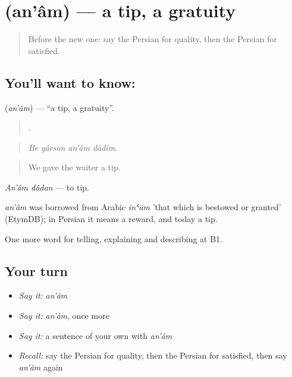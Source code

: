 \section[\texorpdfstring{\fa{انعام} (an'âm)}{انعام (an'âm)}]{ (an'âm) — a tip, a gratuity}

\label{lesson:FA-C443-anam}



\begin{quote}
Before the new one: say the Persian for quality, then the Persian for satisfied.
\end{quote}

\subsection*{You'll want to know: }
\textbf{} (\emph{an'âm}) — \textquotedblleft{}a tip, a gratuity\textquotedblright{}.

\begin{quote}
   .
\end{quote}

\begin{quote}
\emph{Be gârson an'âm dâdim.}
\end{quote}

\begin{quote}
We gave the waiter a tip.
\end{quote}

\emph{An'âm dâdan} — to tip.

\begin{cousinweb}
\emph{an'âm} was borrowed from Arabic \emph{inʿām} 'that which is bestowed or granted' (EtymDB); in Persian it means a reward, and today a tip.
\end{cousinweb}

\begin{grammarlens}[title={What you've built}]
One more word for telling, explaining and describing at B1.
\end{grammarlens}

\subsection*{Your turn}
\begin{itemize}
\raggedright
  \item \emph{Say it:} \emph{an'âm}
  \item \emph{Say it:} \emph{an'âm}, once more
  \item \emph{Say it:} a sentence of your own with \emph{an'âm}
  \item \emph{Recall:} say the Persian for quality, then the Persian for satisfied, then say \emph{an'âm} again
\end{itemize}

